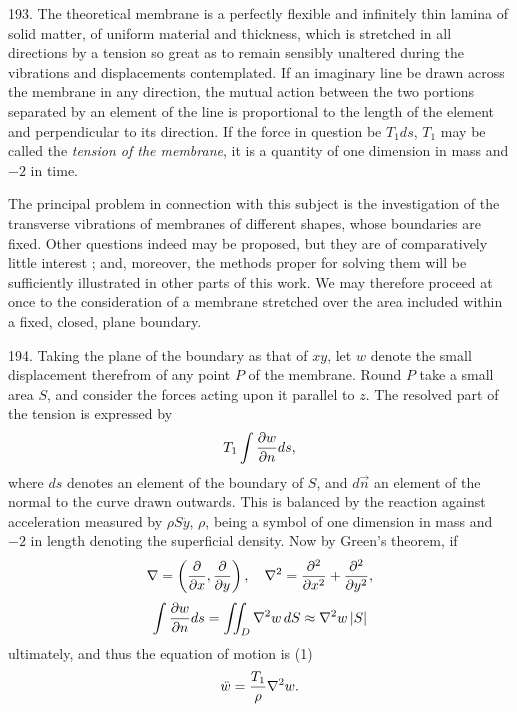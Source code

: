 193. The theoretical membrane is a perfectly flexible and infinitely thin
lamina of solid matter, of uniform material and thickness, which is stretched
in all directions by a tension so great as to remain sensibly unaltered
during the vibrations and displacements contemplated. If an imaginary line be
drawn across the membrane in any direction, the mutual action between the two
portions separated by an element of the line is proportional to the length of
the element and perpendicular to its direction. If the force in question be
\(T_1 ds\), \(T_1\) may be called the \textit{tension of the membrane}, it is
a quantity of one dimension in mass and \(-2\) in time.

The principal problem in connection with this subject is the investigation of
the transverse vibrations of membranes of different shapes, whose boundaries
are fixed. Other questions indeed may be proposed, but they are of
comparatively little interest ; and, moreover, the methods proper for solving
them will be sufficiently illustrated in other parts of this work. We may
therefore proceed at once to the consideration of a membrane stretched over
the area included within a fixed, closed, plane boundary.

\setcounter{equation}{0}
194. Taking the plane of the boundary as that of \(x y\), let \(w\)
denote the small displacement therefrom of any point \(P\)
of the membrane. Round \(P\) take a small area \(S\),
and consider the forces acting upon it parallel to \(z\).
The resolved part of the tension is expressed by
\[ T_1 \int \frac{\partial w}{\partial n} ds,\]
where \(ds\) denotes an element of the boundary of \(S\), and \(d \vec{n}\) an
element of the normal to the curve drawn outwards. This is balanced by
the reaction against acceleration measured by \(\rho S \ddot{y} \),
\(\rho\), being a symbol of one dimension in mass and \(-2\) in length
denoting the superficial density. Now by Green's theorem, if
\[
\nabla = \left(\frac{\partial}{\partial x}, \frac{\partial}{\partial y} \right), \quad
\nabla^2 = \frac{\partial^2}{\partial x^2} + \frac{\partial^2}{\partial y^2},
\]
\[\int \frac{\partial w}{\partial n}ds=\iint_D \nabla^2 w \, dS \approx \nabla^2 w \,|S|\]
ultimately, and thus the equation of motion is (1)
\begin{equation} \ddot{w} = \frac{T_1}{\rho} \nabla^2 w.\end{equation}


